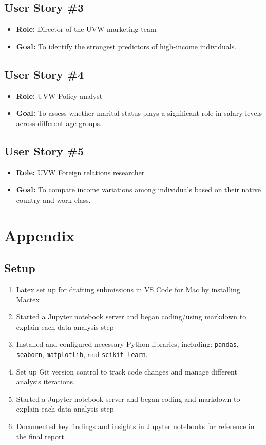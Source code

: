\documentclass[journal]{IEEEtran}
\begin{document}
\subsection{User Story \#3}
\begin{itemize}
    \item \textbf{Role:} Director of the UVW marketing team
    \item \textbf{Goal:} To identify the strongest predictors of high-income individuals.
\end{itemize}

\subsection{User Story \#4}
\begin{itemize}
    \item \textbf{Role:} UVW Policy analyst
    \item \textbf{Goal:} To assess whether marital status plays a significant role in salary levels across different age groups.
\end{itemize}

\subsection{User Story \#5}
\begin{itemize}
    \item \textbf{Role:} UVW Foreign relations researcher
    \item \textbf{Goal:} To compare income variations among individuals based on their native country and work class.
\end{itemize}


\section{Appendix}
\subsection{Setup}
\begin{enumerate}
    \item Latex set up for drafting submissions in VS Code for Mac by installing Mactex
    \item Started a Jupyter notebook server and began coding/using markdown to explain each data analysis step
    \item Installed and configured necessary Python libraries, including: 
    \texttt{pandas}, \texttt{seaborn}, \texttt{matplotlib}, and 
    \texttt{scikit-learn}.
    \item Set up Git version control to track code changes and manage different analysis iterations.
    \item Started a Jupyter notebook server and began coding and markdown to explain each data analysis step
    \item Documented key findings and insights in Jupyter notebooks for reference in the final report.
\end{enumerate}
\end{document}
